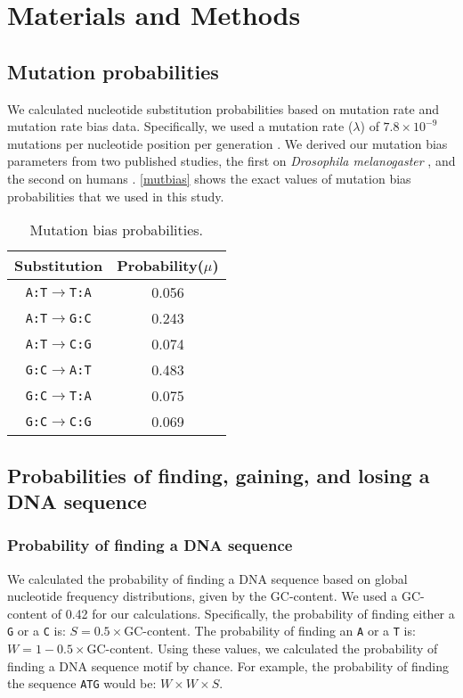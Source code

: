 \documentclass[12pt,a4paper]{article}
\begin{document}
\section{Materials and Methods}

\subsection{Mutation probabilities}

We calculated nucleotide substitution probabilities based on mutation rate and mutation rate bias data. Specifically, we  used a mutation rate ($\lambda$) of $7.8\times10^{-9}$ mutations per nucleotide position per generation \citep{drosophilamutrate}. We derived our mutation bias parameters from two published studies, the first on \textit{Drosophila melanogaster} \citep{drosophilamutrate}, and the second on humans \citep{humanmutrate}. \autoref{mutbias} shows the exact values of mutation bias probabilities that we used in this study.

\begin{table}[H]
\centering
\begin{tabular}{c c}
\toprule
\textbf{Substitution} & Probability($\mu$) \\\midrule
\texttt{A:T}$\to$\texttt{T:A} & 0.056 \\\midrule
\texttt{A:T}$\to$\texttt{G:C} & 0.243 \\\midrule
\texttt{A:T}$\to$\texttt{C:G} & 0.074 \\\midrule
\texttt{G:C}$\to$\texttt{A:T} & 0.483 \\\midrule
\texttt{G:C}$\to$\texttt{T:A} & 0.075 \\\midrule
\texttt{G:C}$\to$\texttt{C:G} & 0.069 \\\bottomrule
\end{tabular}
\caption{Mutation bias probabilities.}
\label{mutbias}
\end{table}

\subsection{Probabilities of finding, gaining, and losing a DNA sequence}
\label{methbasic}

\subsubsection{Probability of finding a DNA sequence}
\label{methprob}

We calculated the probability of finding a DNA sequence based on global nucleotide frequency distributions, given by the GC-content. We used a GC-content of 0.42 for our calculations. Specifically, the probability of finding either a \texttt{G} or a \texttt{C} is: $S = 0.5\times$GC-content. The probability of finding an \texttt{A} or a \texttt{T} is: $W = 1 - 0.5\times$GC-content. Using these values, we calculated the probability of finding a DNA sequence motif by chance. For example, the probability of finding the sequence \texttt{ATG} would be: $W\times W \times S$.
\end{document}

